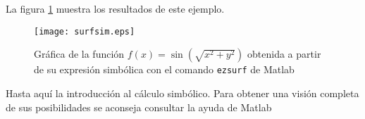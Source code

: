 La figura \ref{fig:surfsim} muestra los resultados de este ejemplo. 

\begin{figure}[h]
\centering
\texttt{[image: surfsim.eps]}
\caption{Gráfica de la función $f(x) = \sin\left(\sqrt{x^2+y^2}\right)$ obtenida a partir de su expresión simbólica con el comando \texttt{ezsurf} de Matlab }
\label{fig:surfsim}
\end{figure}

Hasta aquí la introducción al cálculo simbólico. Para obtener una visión completa de sus posibilidades se aconseja consultar la ayuda de Matlab






  

  	 